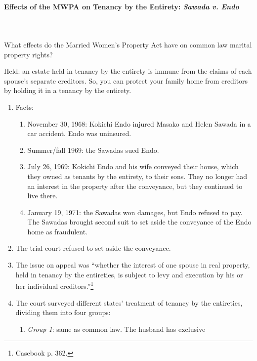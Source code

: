 \paragraph{Effects of the MWPA on Tenancy by the Entirety: \emph{Sawada v. Endo}}
~\\\\
What effects do the Married Women's Property Act have on common law marital 
property rights?

Held: an estate held in tenancy by the entirety is immune from the claims of 
each spouse's separate creditors. So, you can protect your family home from 
creditors by holding it in a tenancy by the entirety.


\begin{enumerate}
    \item Facts:
    \begin{enumerate}
        \item November 30, 1968: Kokichi Endo injured Masako and Helen Sawada 
        in a car accident. Endo was uninsured.
        \item Summer/fall 1969: the Sawadas sued Endo.
        \item July 26, 1969: Kokichi Endo and his wife conveyed their house, 
        which they owned as tenants by the entirety, to their sons. They no 
        longer had an interest in the property after the conveyance, but they 
        continued to live there.
        \item January 19, 1971: the Sawadas won damages, but Endo refused to 
        pay. The Sawadas brought second suit to set aside the conveyance of 
        the Endo home as fraudulent.
    \end{enumerate}
    \item The trial court refused to set aside the conveyance.
    \item The issue on appeal was ``whether the interest of one spouse in real 
    property, held in tenancy by the entireties, is subject to levy and 
    execution by his or her individual creditors.''\footnote{Casebook p. 362.}
    \item The court surveyed different states' treatment of tenancy by the 
    entireties, dividing them into four groups:
    \begin{enumerate}
        \item \emph{Group 1}: same as common law. The husband has exclusive 

\end{enumerate}
\end{enumerate}
